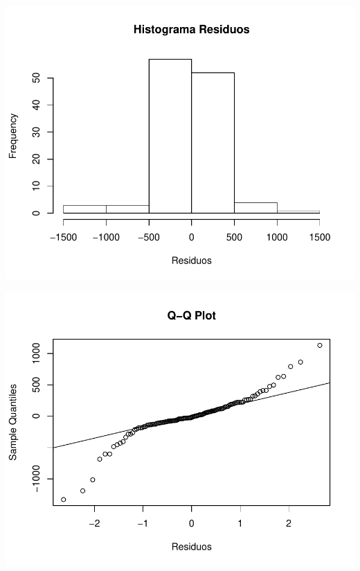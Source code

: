 \documentclass[11pt,a4paper,oneside]{article}\usepackage[]{graphicx}\usepackage[]{color}
\makeatletter
\def\maxwidth{ %
  \ifdim\Gin@nat@width>\linewidth
    \linewidth
  \else
    \Gin@nat@width
  \fi
}
\newenvironment{knitrout}{}{} %
\makeatother
\begin{document}
\begin{knitrout}
{\centering \includegraphics[width=\maxwidth]{figure/unnamed-chunk-16-11} 

}




{\centering \includegraphics[width=\maxwidth]{figure/unnamed-chunk-16-12} 

}





\end{knitrout}
\end{document}
